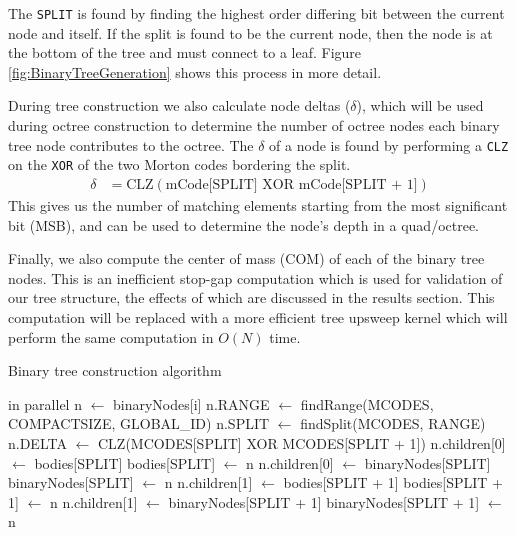 \documentclass{thesis}
\begin{document}
The \texttt{SPLIT} is found by finding the highest order differing bit between the current node and itself. If the split is found to be the current node, then the node is at the bottom of the tree and must connect to a leaf. Figure \ref{fig:BinaryTreeGeneration} shows this process in more detail.

During tree construction we also calculate node deltas ($\delta$), which will be used during octree construction to determine the number of octree nodes each binary tree node contributes to the octree. The $\delta$ of a node is found by performing a \texttt{CLZ} on the \texttt{XOR} of the two  Morton codes bordering the split.
\begin{align}
    \delta &= \text{CLZ}(\text{mCode[SPLIT]} \text{ XOR } \text{mCode[SPLIT + 1]})
\end{align}
This gives us the number of matching elements starting from the most significant bit (MSB), and can be used to determine the node's depth in a quad/octree.

Finally, we also compute the center of mass (COM) of each of the binary tree nodes. This is an inefficient stop-gap computation which is used for validation of our tree structure, the effects of which are discussed in the results section. This computation will be replaced with a more efficient tree upsweep kernel which will perform the same computation in $O(N)$ time.

\begin{algorithm}
    \label{alg:BinaryTreeConstruction}
    \caption{Binary tree construction algorithm}
    \begin{algorithmic}
         in parallel
            \State n $\gets$ binaryNodes[i]
            \State n.RANGE $\gets$ findRange(MCODES, COMPACTSIZE, GLOBAL\_ID)
            \State n.SPLIT $\gets$ findSplit(MCODES, RANGE)
            \State n.DELTA $\gets$ CLZ(MCODES[SPLIT] XOR MCODES[SPLIT + 1])
                \State n.children[0] $\gets$ bodies[SPLIT]
                \State bodies[SPLIT] $\gets$ n
            \Else
                \State n.children[0] $\gets$ binaryNodes[SPLIT]
                \State binaryNodes[SPLIT] $\gets$ n
            \EndIf
                \State n.children[1] $\gets$ bodies[SPLIT + 1]
                \State bodies[SPLIT + 1] $\gets$ n
            \Else
                \State n.children[1] $\gets$ binaryNodes[SPLIT + 1]
                \State binaryNodes[SPLIT + 1] $\gets$ n
            \EndIf
        \EndFor
    \end{algorithmic}
\end{algorithm}
\end{document}
